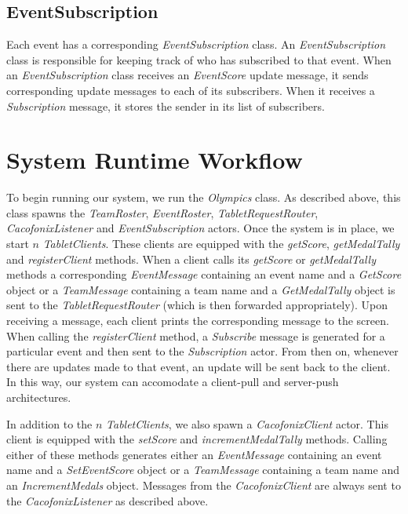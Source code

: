 \documentclass[11pt]{article}
\begin{document}
\subsection{EventSubscription}
Each event has a corresponding \emph{EventSubscription} class. An
\emph{EventSubscription} class is responsible for keeping track of who
has subscribed to that event. When an \emph{EventSubscription} class
receives an \emph{EventScore} update message, it sends corresponding
update messages to each of its subscribers.  When it receives a
\emph{Subscription} message, it stores the sender in its list of
subscribers.

\section{System Runtime Workflow}
To begin running our system, we run the \emph{Olympics} class.  As
described above, this class spawns the \emph{TeamRoster},
\emph{EventRoster}, \emph{TabletRequestRouter},
\emph{CacofonixListener} and \emph{EventSubscription} actors.  Once
the system is in place, we start $n$ \emph{TabletClients}.  These
clients are equipped with the \emph{getScore}, \emph{getMedalTally}
and \emph{registerClient} methods. When a client calls its
\emph{getScore} or \emph{getMedalTally} methods a corresponding
\emph{EventMessage} containing an event name and a \emph{GetScore}
object or a \emph{TeamMessage} containing a team name and a
\emph{GetMedalTally} object is sent to the \emph{TabletRequestRouter}
(which is then forwarded appropriately).  Upon receiving a message, each
client prints the corresponding message to the screen.  When calling
the \emph{registerClient} method, a \emph{Subscribe} message is
generated for a particular event and then sent to the
\emph{Subscription} actor.  From then on, whenever there are updates
made to that event, an update will be sent back to the client.  In
this way, our system can accomodate a client-pull and server-push
architectures.

In addition to the $n$ \emph{TabletClients}, we also spawn a
\emph{CacofonixClient} actor.  This client is equipped with the
\emph{setScore} and \emph{incrementMedalTally} methods.  Calling
either of these methods generates either an \emph{EventMessage}
containing an event name and a \emph{SetEventScore} object or a
\emph{TeamMessage} containing a team name and an
\emph{IncrementMedals} object.  Messages from the
\emph{CacofonixClient} are always sent to the \emph{CacofonixListener}
as described above.
\end{document}
